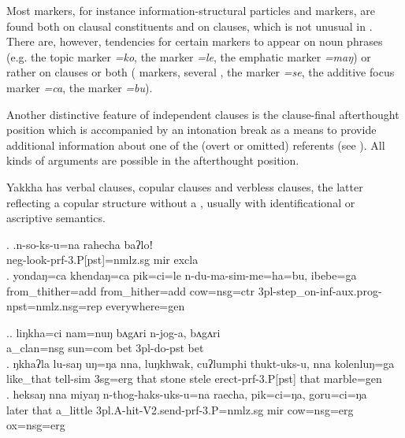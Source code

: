  Most markers, for instance information-structural particles and  markers, are found  both on clausal constituents and on clauses, which is not unusual in . There are, however, tendencies for certain markers to appear on noun phrases (e.g. the topic marker \emph{=ko}, the  marker \emph{=le}, the emphatic marker \emph{=maŋ}) or rather on clauses or both ( markers, several , the  marker \emph{=se}, the additive focus marker \emph{=ca}, the  marker \emph{=bu}). 
 
 Another distinctive feature of independent clauses is the clause-final afterthought position which is accompanied by an intonation break as a means to provide additional information about one of the (overt or omitted) referents (see \NNext). All kinds of arguments are possible in the afterthought position. 
 
 Yakkha has verbal clauses, copular clauses and verbless clauses, the latter  reflecting a copular structure without a , usually with identificational or ascriptive semantics.

 \ex. \ag.n-so-ks-u=na                           rahecha baʔloǃ\\
 {\sc neg-}look{\sc -prf-3.P[pst]=nmlz.sg} {\sc mir} {\sc excla}\\
  
  \bg. yondaŋ=ca           khendaŋ=ca         pik=ci=le        n-du-ma-sim-me=ha=bu,           ibebe=ga\\
 from\_thither{\sc =add} from\_hither{\sc =add} cow{\sc =nsg=ctr} {\sc 3pl-}step\_on{\sc -inf-aux.prog-npst=nmlz.nsg=rep} everywhere{\sc =gen}\\
   

 \ex.\ag. liŋkha=ci nam=nuŋ bʌgʌri n-jog-a,  bʌgʌri\\
 	a\_clan{\sc =nsg} sun{\sc =com}   bet    {\sc 3pl-}do{\sc -pst} bet\\
 	 
 \bg.  ŋkhaʔla   lu-saŋ        uŋ=ŋa   nna,  luŋkhwak, cuʔlumphi thukt-uks-u,           nna  kolenluŋ=ga\\
 like\_that tell{\sc -sim} {\sc 3sg=erg} that stone stele erect{\sc -prf-3.P[pst]} that marble{\sc =gen}\\
  
\bg. heksaŋ nna  miyaŋ n-thog-haks-uks-u=na     raecha, pik=ci=ŋa,      goru=ci=ŋa\\
later that a\_little {\sc 3pl.A-}hit{\sc -V2.send-prf-3.P=nmlz.sg} {\sc mir} cow{\sc =nsg=erg} ox{\sc =nsg=erg}\\
 


